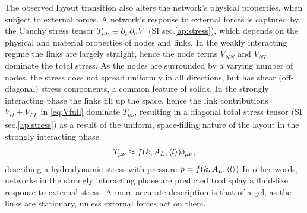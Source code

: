 \documentclass[nofootinbib,preprint,floatfix,titlepage,endfloats,superscriptaddress]{revtex4} %
\begin{document}
The observed layout transition also alters the  network's physical properties, when subject to external forces.
A network's response to external forces is captured by the Cauchy stress tensor $T_{\mu\nu} \equiv \partial_\mu\partial_\nu V$ \cite{irgens2008continuum} (SI sec.\ref{ap:stress}), which depends on the physical and material properties of nodes and links. 
In the weakly interacting regime the links are largely straight, hence the node terms $V_{NN}$ and $V_{NL}$ dominate the total stress. 
As the nodes are surrounded by a varying number of nodes, the stress does not spread uniformly in all directions, but has shear (off-diagonal) stress components, a common feature of solids.
In the strongly interacting phase the links fill up the space,
hence the link contributions $V_{el}+V_{LL}$ in \eqref{eq:Vfull} dominate $T_{\mu\nu}$, 
resulting in a diagonal total stress tensor (SI sec.\ref{ap:stress}) as a result of the uniform, space-filling nature of the layout in the strongly interacting phase
\begin{equation}
    T_{\mu\nu} \approx %
    f(k,A_L,\be{l})\delta_{\mu\nu} \label{eq:Tstrong}
,\end{equation}
%
describing a hydrodynamic stress with pressure $p = f(k,A_L,\left<l\right>)$ %
In other words, networks in the strongly interacting phase are predicted to display a fluid-like response to external stress. 
A more accurate description is that of a gel, %
as the links are stationary, unless external forces act on them. 
\end{document}
